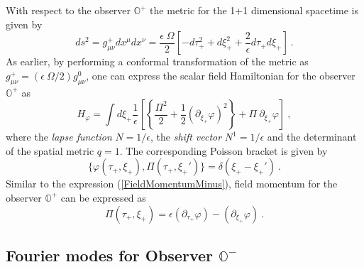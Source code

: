 \documentclass[aps,12pt,showpacs]{revtex4-2}
\def\observerminus{\mathbb{O}^{-}}
\def\observerplus{\mathbb{O}^{+}}
\begin{document}
With respect to the observer $\observerplus$ the metric for the 1+1 dimensional 
spacetime is given by
%
\begin{equation}\label{NearNullMetricPlus}
ds^2 = g^{+}_{\mu\nu}dx^{\mu}dx^{\nu} = \frac{\epsilon\; \Omega}{2}
\left[ - d\tau_{+}^2 + d\xi_{+}^2 
+ \frac{2}{\epsilon} d\tau_{+} d\xi_{+} \right]  ~. 
\end{equation}
%
As earlier, by performing a conformal transformation of the metric as 
$g^{+}_{\mu\nu} = (\epsilon ~\Omega/2) g^{0}_{\mu\nu}$, one can express the 
scalar field Hamiltonian for the observer $\observerplus$ as
%
\begin{equation}\label{ScalarHamiltonianFullPlus}
H_{\varphi} = \int d\xi_{+}  \frac{1}{\epsilon} \left[
\left\{ \frac{\Pi^2}{2}  + \frac{1}{2}  (\partial_{\xi_{+}}\varphi)^2 \right\} 
+ \Pi~ \partial_{\xi_{+}} \varphi \right] ~,
\end{equation}
%
where the \emph{lapse function} $N = 1/\epsilon$, the \emph{shift 
vector} $N^1 = 1/\epsilon$ and the determinant of the spatial metric
$q = 1$.  The corresponding Poisson bracket is given by
%
\begin{equation}\label{PoissonBracketPlus}
\{\varphi(\tau_{+},\xi_{+}), \Pi(\tau_{+},\xi_{+}')\} = \delta(\xi_{+} - 
\xi_{+}') ~.
\end{equation}
%
Similar to the expression (\ref{FieldMomentumMinus}), field momentum for the
observer $\observerplus$ can be expressed as 
%
\begin{equation}\label{FieldMomentumPlus}
\Pi(\tau_{+},\xi_{+}) = \epsilon (\partial_{\tau_{+}}\varphi) 
- (\partial_{\xi_{+}}\varphi) ~.
\end{equation}
%



\subsection{Fourier modes for Observer $\observerminus$ }
\end{document}
